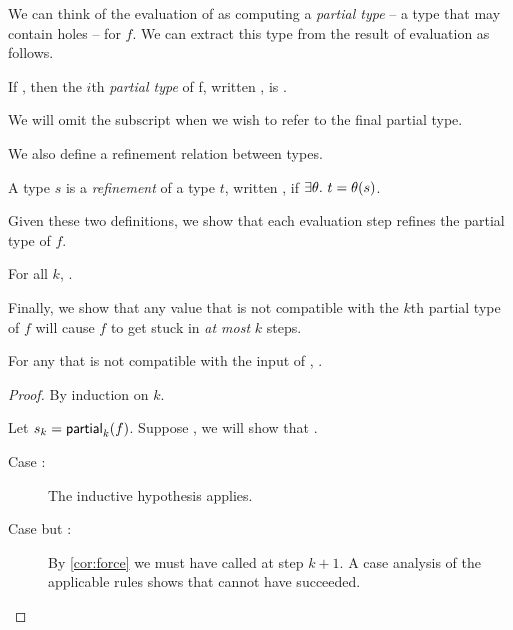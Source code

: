 We can think of the evaluation of  as
computing a \emph{partial type} -- a type that may contain holes -- for
$f$. We can extract this type from the result of evaluation as follows.

\begin{defn}
\label{defn:partial-type}
  If , then the $i$th
  \emph{partial type} of f, written ,
  is .

  We will omit the subscript when we wish to refer to the final partial
  type. 
\end{defn}

We also define a refinement relation between types.

\begin{defn}
\label{defn:subtyping}
  A type $s$ is a \emph{refinement} of a type $t$, written , if
  $\exists \theta.\ t = \theta(s)$.
\end{defn}

Given these two definitions, we show that each evaluation step
refines the partial type of $f$.

\begin{lem}
\label{lem:refine-partial}
  For all $k$, .
\end{lem}

Finally, we show that any value that is not compatible with the $k$th
partial type of $f$ will cause $f$ to get stuck in \emph{at most} $k$
steps.

\begin{lem}
\label{lem:k-stuck}
  For any  that is not compatible with
  the input of , .
\end{lem}
\begin{proof}
  By induction on $k$.
  
  Let $s_k = \mathsf{partial}_{k}(f)$. Suppose , we
  will show that .

  \begin{description}
  \item[Case :] 
    The inductive hypothesis applies.
  \item[Case  but :]
    By \autoref{cor:force} we must have called \forcesym at step $k+1$. A
    case analysis of the applicable rules shows that \forcesym cannot
    have succeeded.
  \end{description}
\end{proof}

